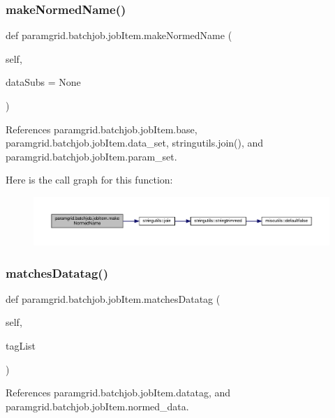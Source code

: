 \subsubsection{\texorpdfstring{make\+Normed\+Name()}{makeNormedName()}}
{\footnotesize\ttfamily def paramgrid.\+batchjob.\+job\+Item.\+make\+Normed\+Name (\begin{DoxyParamCaption}\item[{}]{self,  }\item[{}]{data\+Subs = {\ttfamily None} }\end{DoxyParamCaption})}



References paramgrid.\+batchjob.\+job\+Item.\+base, paramgrid.\+batchjob.\+job\+Item.\+data\+\_\+set, stringutils.\+join(), and paramgrid.\+batchjob.\+job\+Item.\+param\+\_\+set.

Here is the call graph for this function\+:
\nopagebreak
\begin{figure}[H]
\begin{center}
\leavevmode
\includegraphics[width=350pt]{classparamgrid_1_1batchjob_1_1jobItem_a00fa8cb2fb3cfd794d9ec31cc44a0e2d_cgraph}
\end{center}
\end{figure}
\mbox{\label{classparamgrid_1_1batchjob_1_1jobItem_a6d38d60909397622e79b25f7a4f9ebd3}} 
\subsubsection{\texorpdfstring{matches\+Datatag()}{matchesDatatag()}}
{\footnotesize\ttfamily def paramgrid.\+batchjob.\+job\+Item.\+matches\+Datatag (\begin{DoxyParamCaption}\item[{}]{self,  }\item[{}]{tag\+List }\end{DoxyParamCaption})}



References paramgrid.\+batchjob.\+job\+Item.\+datatag, and paramgrid.\+batchjob.\+job\+Item.\+normed\+\_\+data.

